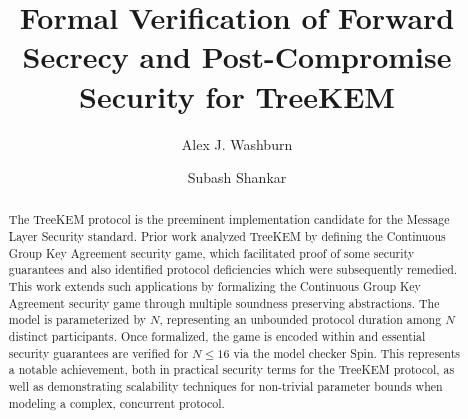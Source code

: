\documentclass[runningheads]{llncs}
\begin{document}
\title{Formal Verification of Forward Secrecy and Post-Compromise Security for TreeKEM}
%

\author{Alex J. Washburn \and
Subash Shankar}



%

\maketitle              %
%
\begin{abstract}
The TreeKEM protocol is the preeminent implementation candidate for the Message Layer Security standard.
Prior work analyzed TreeKEM by defining the Continuous Group Key Agreement security game,
which facilitated proof of some security guarantees and also identified protocol deficiencies which were subsequently remedied.
This work extends such applications by formalizing the Continuous Group Key Agreement security game through multiple soundness preserving abstractions.
The model is parameterized by $N$, representing an unbounded protocol duration among $N$ distinct participants.
Once formalized, the game is encoded within \Promela and essential security guarantees are verified for $N \le 16$ via the model checker Spin.
This represents a notable achievement, both in practical security terms for the TreeKEM protocol, as well as demonstrating scalability techniques for non-trivial parameter bounds when modeling a complex, concurrent protocol.
\end{abstract}
\end{document}
